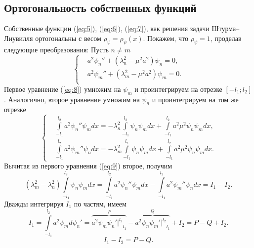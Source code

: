 \documentclass[12pt, a4paper, draft]{article}
\begin{document}
\subsection{Ортогональность собственных функций}
Собственные функции (\ref{eq:5}), (\ref{eq:6}), (\ref{eq:7}), как решения задачи Штурма--Лиувилля ортогональны с весом $\rho_\psi=\rho_\psi(x)$. Покажем, что $\rho_\psi=1$, проделав следующие преобразования:
Пусть $n \ne m$
\begin{equation}
  \left\{  
    \begin{aligned}
      & a^2 \psi_n'' + (\lambda_n^2 - \mu^2 a^2) \psi_n = 0, \\
      & a^2 \psi_m'' + (\lambda_m^2 - \mu^2 a^2) \psi_m = 0. \\
    \end{aligned}
  \right.
  \label{eq:8}
\end{equation}
Первое уравнение (\ref{eq:8}) умножим на $\psi_m$ и проинтегрируем на отрезке $[-l_1; l_2]$. Аналогично, второе уравнение умножим на $\psi_n$ и проинтегрируем на том же отрезке
\begin{equation}
  \left\{  
    \begin{aligned}
      & \int \limits^{l_2}_{-l_1} a^2 \psi_n'' \psi_m dx = - \lambda_n^2 \int \limits^{l_2}_{-l_1} \psi_n \psi_m dx + \int \limits^{l_2}_{-l_1} a^2 \mu^2 \psi_n \psi_m dx, \\
      & \int \limits^{l_2}_{-l_1} a^2 \psi_m'' \psi_n dx = - \lambda_m^2 \int \limits^{l_2}_{-l_1} \psi_n \psi_m dx + \int \limits^{l_2}_{-l_1} a^2 \mu^2 \psi_n \psi_m dx. 
    \end{aligned}
  \right.
  \label{eq:9}
\end{equation}
Вычитая из первого уравнения (\ref{eq:9}) второе, получим 
\begin{equation}
  (\lambda_m^2 - \lambda_n^2) \int \limits^{l_2}_{-l_1} \psi_n \psi_m dx =  \int \limits^{l_2}_{-l_1} a^2 \psi_n'' \psi_m dx -  \int \limits^{l_2}_{-l_1} a^2 \psi_m'' \psi_n dx = I_1 - I_2.
  \label{eq:11}
\end{equation}
Дважды интегрируя $I_1$ по частям, имеем
\begin{equation}
  I_1 =  \int \limits^{l_2}_{-l_1} a^2 \psi_m d \psi_n' = \overbrace{a^2 \psi_m \psi_n' \Big|^{l_2}_{-l_1}}^P - \overbrace{a^2 \psi_n \psi_m' \Big|^{l_2}_{-l_1}}^Q + I_2 = P - Q + I_2.
\end{equation}
\begin{equation}
  I_1 - I_2 = P - Q.
  \label{eq:10}
\end{equation}
\end{document}
